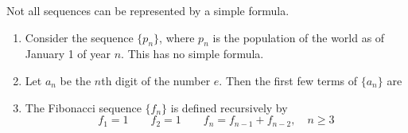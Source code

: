 \begin{frame}
Not all sequences can be represented by a simple formula.
\begin{example}[Example 2, p. 712]
\begin{enumerate}
\item  Consider the sequence $\{ p_n\}$, where $p_n$ is the population of the world as of January 1 of year $n$.  This has no simple formula.
\item<2->  Let $a_n$ be the $n$th digit of the number $e$.  Then the first few terms of $\{ a_n\}$ are
%
\item<3->  The Fibonacci sequence $\{ f_n\}$ is defined recursively by
\[
f_1 = 1 \qquad f_2 = 1 \qquad f_n = f_{n-1} + f_{n-2}, \quad n\geq 3
\]
%
%
\end{enumerate}
\end{example}
\end{frame}
